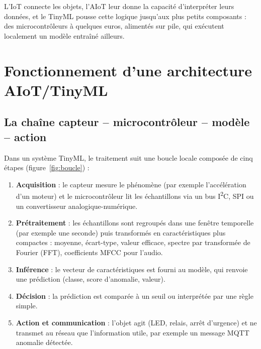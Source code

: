 \begin{aretenir}
L'IoT connecte les objets, l'AIoT leur donne la capacité d'interpréter leurs
données, et le TinyML pousse cette logique jusqu'aux plus petits composants :
des microcontrôleurs à quelques euros, alimentés sur pile, qui exécutent
localement un modèle entraîné ailleurs.
\end{aretenir}

\section{Fonctionnement d'une architecture AIoT/TinyML}
\label{sec:archi}

\subsection{La chaîne capteur -- microcontrôleur -- modèle -- action}

Dans un système TinyML, le traitement suit une boucle locale composée de cinq
étapes (figure~\ref{fig:boucle}) :

\begin{enumerate}
  \item \textbf{Acquisition} : le capteur mesure le phénomène (par exemple
        l'accélération d'un moteur) et le microcontrôleur lit les échantillons
        via un bus I\textsuperscript{2}C, SPI ou un convertisseur
        analogique-numérique.
  \item \textbf{Prétraitement} : les échantillons sont regroupés dans une
        fenêtre temporelle (par exemple une seconde) puis transformés en
        caractéristiques plus compactes : moyenne, écart-type, valeur efficace,
        spectre par transformée de Fourier (FFT), coefficients MFCC pour l'audio.
  \item \textbf{Inférence} : le vecteur de caractéristiques est fourni au modèle,
        qui renvoie une prédiction (classe, score d'anomalie, valeur).
  \item \textbf{Décision} : la prédiction est comparée à un seuil ou interprétée
        par une règle simple.
  \item \textbf{Action et communication} : l'objet agit (LED, relais, arrêt
        d'urgence) et ne transmet au réseau que l'information utile, par exemple
        un message MQTT \og anomalie détectée\fg{}.
\end{enumerate}

